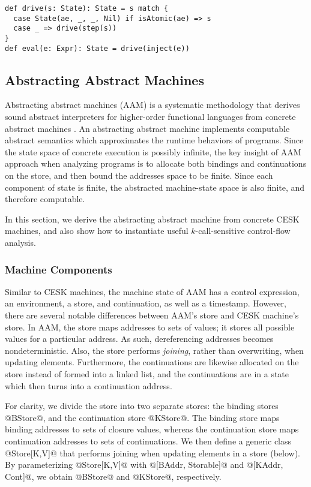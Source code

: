 \documentclass[acmsmall]{acmart}\settopmatter{}
\begin{document}
\begin{lstlisting}
def drive(s: State): State = s match {
  case State(ae, _, _, Nil) if isAtomic(ae) => s
  case _ => drive(step(s))
}
def eval(e: Expr): State = drive(inject(e))
\end{lstlisting}

\subsection{Abstracting Abstract Machines} \label{aam}
Abstracting abstract machines (AAM) is a systematic methodology that derives sound
abstract interpreters for higher-order functional languages from concrete abstract 
machines \cite{van2012systematic, van2010abstracting}. An abstracting abstract machine
implements computable abstract semantics which approximates the runtime behaviors of 
programs.
Since the state space of concrete execution is possibly infinite, the key insight of 
AAM approach when analyzing programs is to allocate both bindings and continuations 
on the store, and then bound the addresses space to be finite. Since each component
of state is finite, the abstracted machine-state space is also finite, and therefore
computable.

In this section, we derive the abstracting abstract machine from concrete
CESK machines, and also show how to instantiate useful $k$-call-sensitive 
control-flow analysis.

\subsubsection{Machine Components}

Similar to CESK machines, the machine state of AAM has a control expression,
an environment, a store, and continuation, as well as a timestamp.
However, there are several notable differences between AAM's store and CESK machine's store.
In AAM, the store maps addresses to sets of values; it stores all possible values
for a particular address. As such, dereferencing addresses becomes nondeterministic.
Also, the store performs \emph{joining}, rather than overwriting, when updating elements.
Furthermore, the continuations are likewise allocated on the store instead of formed into a
linked list, and the continuations are in a state which then turns into a continuation
address.

For clarity, we divide the store into two separate stores: the binding stores @BStore@, and
the continuation store @KStore@.
The binding store maps binding addresses to sets of closure values, whereas the continuation
store maps continuation addresses to sets of continuations.
We then define a generic class @Store[K,V]@ that performs joining when updating elements
in a store (below). By parameterizing @Store[K,V]@ with @[BAddr, Storable]@ and
@[KAddr, Cont]@, we obtain @BStore@ and @KStore@, respectively.
\end{document}
